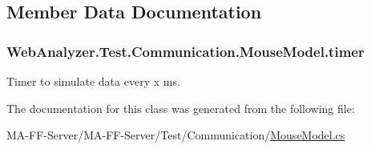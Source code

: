 \subsection{Member Data Documentation}
\hypertarget{class_web_analyzer_1_1_test_1_1_communication_1_1_mouse_model_a23daaf5b022d16c45c6f9d0084da2819}{}
\subsubsection[{timer}]{ Web\+Analyzer.\+Test.\+Communication.\+Mouse\+Model.\+timer\hspace{0.3cm}{\ttfamily [private]}}\label{class_web_analyzer_1_1_test_1_1_communication_1_1_mouse_model_a23daaf5b022d16c45c6f9d0084da2819}


Timer to simulate data every x ms. 



The documentation for this class was generated from the following file\+:\begin{DoxyCompactItemize}
\item 
M\+A-\/\+F\+F-\/\+Server/\+M\+A-\/\+F\+F-\/\+Server/\+Test/\+Communication/\hyperlink{_mouse_model_8cs}{Mouse\+Model.\+cs}\end{DoxyCompactItemize}
